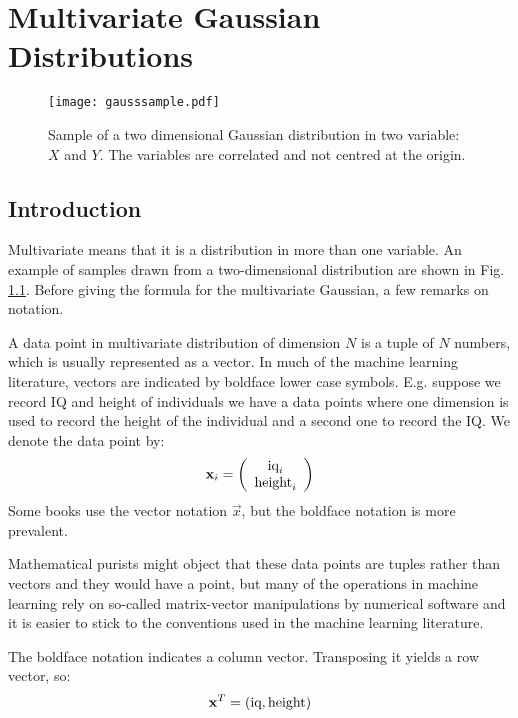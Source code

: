 \chapter{Multivariate Gaussian Distributions}

\begin{figure}[!ht]
\begin{center}
\texttt{[image: gausssample.pdf]}
\end{center}
\caption{Sample of a two dimensional Gaussian distribution in two variable: $X$ and $Y$. The variables are correlated and not centred at the origin.}
\label{fig-2dgauss}
\end{figure}
   \section{Introduction}

  Multivariate means that it is a distribution in more than one variable. An example of samples drawn from a two-dimensional distribution are shown in Fig. \ref{fig-2dgauss}.
  Before giving the formula for the multivariate Gaussian, a few remarks on notation.

  A data point in multivariate distribution of dimension $N$ is a tuple of $N$ numbers, which is usually represented as a vector. In much of the machine learning literature,
  vectors are indicated by boldface lower case symbols. E.g. suppose we record IQ and height of individuals we have a data points where one dimension is used to record
  the height of the individual and a second one to record the IQ. We denote the data point by:
  \begin{equation}
    {\bf x}_i = \left( \begin{array}{c} \mbox{iq}_i \\ \mbox{height}_i \end{array} \right)
  \end{equation}
  Some books use the vector notation $\vec{x}$, but the boldface notation is more prevalent.

  Mathematical purists might object that these data points are tuples rather than vectors and they would have a point, but many of the operations in machine learning rely
  on so-called matrix-vector manipulations by numerical software and it is easier to stick to the conventions used in the machine learning literature.

  The boldface notation indicates a column vector. Transposing it yields a row vector, so:
  \begin{equation}
    {\bf x}^T = ( \mbox{iq}, \mbox{height} )
  \end{equation}

